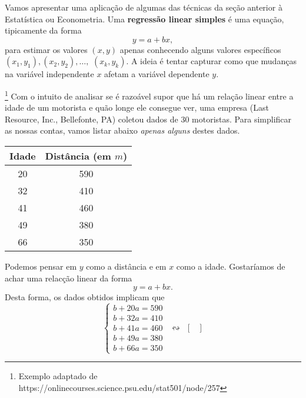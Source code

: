 \documentclass[../livro.tex]{subfiles}  %
\begin{document}
Vamos apresentar uma aplicação de algumas das técnicas da seção anterior à Estatística ou Econometria. Uma \textbf{regressão linear simples} é uma equação, tipicamente da forma
\begin{equation}
y = a + b x,
\end{equation} para estimar os valores $(x,y)$ apenas conhecendo alguns valores específicos $(x_1, y_1), (x_2, y_2), \dots,$ $(x_k, y_k)$. A ideia é tentar capturar como que mudanças na variável independente $x$ afetam a variável dependente $y$.

\begin{example}\footnote{Exemplo adaptado de https://onlinecourses.science.psu.edu/stat501/node/257}\label{exp:idade}
  Com o intuito de analisar se é razoável supor que há um relação linear entre a idade de um motorista e quão longe ele consegue ver, uma empresa (Last Resource, Inc., Bellefonte, PA) coletou dados de 30 motoristas. Para simplificar as nossas contas, vamos listar abaixo \textit{apenas alguns} destes dados.
  \begin{center}
    \begin{tabular}{|c|c|}
      \hline
      Idade & Distância (em $m$) \\ \hline
      20 & 590 \\
      32 & 410 \\
      41 & 460 \\
      49 & 380 \\
      66 & 350 \\
      \hline
    \end{tabular}
  \end{center} Podemos pensar em $y$ como a distância e em $x$ como a idade. Gostaríamos de achar uma relacção linear da forma
  \begin{equation}
  y = a + b x.
  \end{equation} Desta forma, os dados obtidos implicam que  
  \begin{equation}
  \left\{
    \begin{array}{ll}
      b + 20 a = 590 \\
      b + 32 a = 410 \\
      b + 41 a = 460 \\
      b + 49 a = 380 \\
      b + 66 a = 350
    \end{array}
  \right. \ \ \leftrightsquigarrow \ \
  \begin{bmatrix}

\end{bmatrix}
\end{equation}
\end{example}
\end{document}

